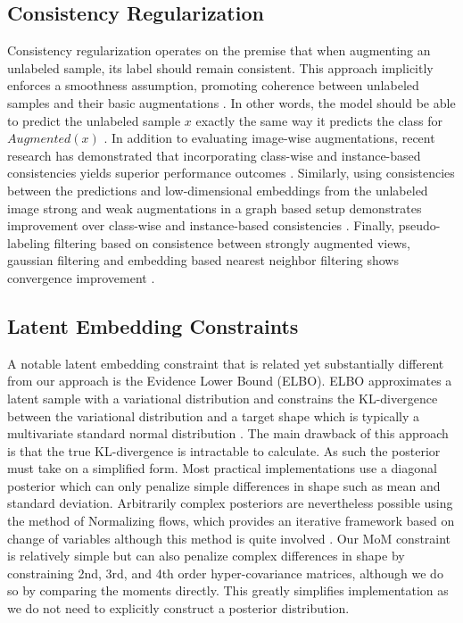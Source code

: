 \documentclass[10pt,twocolumn,letterpaper]{article}
\begin{document}
\subsection{Consistency Regularization}

Consistency regularization operates on the premise that when augmenting an unlabeled sample, its label should remain consistent. 
This approach implicitly enforces a smoothness assumption, promoting coherence between unlabeled samples and their basic augmentations \cite{xie2020unsupervised}. 
In other words, the model should be able to predict the unlabeled sample $x$ exactly the same way it predicts the class for $Augmented(x)$ \cite{berthelot2019mixmatch,sohn2020fixmatch,berthelot2019remixmatch,mustafa2020transformation}. 
In addition to evaluating image-wise augmentations, recent research has demonstrated that incorporating class-wise and instance-based consistencies yields superior performance outcomes \cite{zheng2022simmatch,li2021comatch}. 
Similarly, using consistencies between the predictions and low-dimensional embeddings from the unlabeled image strong and weak augmentations in a graph based setup demonstrates improvement over class-wise and instance-based consistencies \cite{zheng2023simmatchv2}.
Finally, pseudo-labeling filtering based on consistence between strongly augmented views, gaussian filtering and embedding based nearest neighbor filtering shows convergence improvement \cite{kim2022conmatch,menon2022semisupervised}.

\subsection{Latent Embedding Constraints}

A notable latent embedding constraint  that is related yet substantially different from our approach is the Evidence Lower Bound (ELBO).
ELBO approximates a latent sample with a variational distribution and constrains the KL-divergence between the variational distribution and a target shape which is typically a multivariate standard normal distribution \cite{kingma2013auto}. 
The main drawback of this approach is that the true KL-divergence is intractable to calculate.  
As such the posterior must take on a simplified form. 
Most practical implementations use a diagonal posterior which can only penalize simple differences in shape such as mean and standard deviation.  
Arbitrarily complex posteriors are nevertheless possible using the method of Normalizing flows, which provides an iterative framework based on change of variables although this method is quite involved \cite{rezende2015variational,kingma2016improved,caterini2021variational}.  
Our MoM constraint is relatively simple but can also penalize complex differences in shape by constraining 2nd, 3rd, and 4th order hyper-covariance matrices, although we do so by comparing the moments directly.  
This greatly simplifies implementation as we do not need to explicitly construct a posterior distribution.
\end{document}

